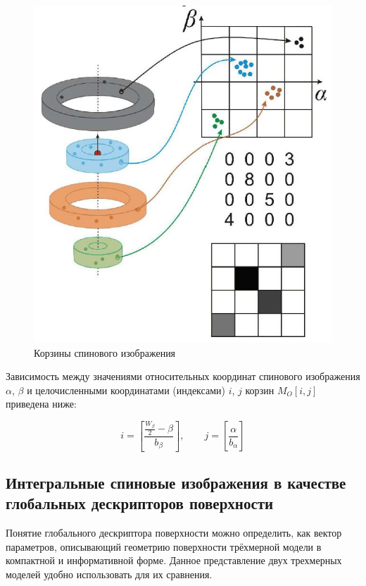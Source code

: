 \documentclass[14pt]{article}
\numberwithin{figure}{section}
\numberwithin{equation}{section}
\begin{document}
\begin{figure}[h]
	\begin{center}
		\includegraphics[scale=0.7]{3.JPG}
		\caption{Корзины спинового изображения}
		\label{ris:3}
	\end{center}
\end{figure}


Зависимость между значениями относительных координат спинового изображения $\alpha$, $\beta$ и целочисленными координатами (индексами) $i$, $j$ корзин $M_O[i, j]$ приведена ниже:

\begin{equation}
	i = \left[ \frac{\frac{W_{\beta}}{2} - \beta}{b_{\beta}} \right], \qquad j = \left[ \frac{\alpha}{b_{\alpha}} \right]
\end{equation}

\subsection{Интегральные спиновые изображения в качестве \\ глобальных дескрипторов поверхности}

Понятие глобального дескриптора поверхности можно определить, как вектор параметров, описывающий геометрию поверхности трёхмерной модели в компактной и информативной форме. Данное представление двух трехмерных моделей удобно использовать для их сравнения.
\end{document}
